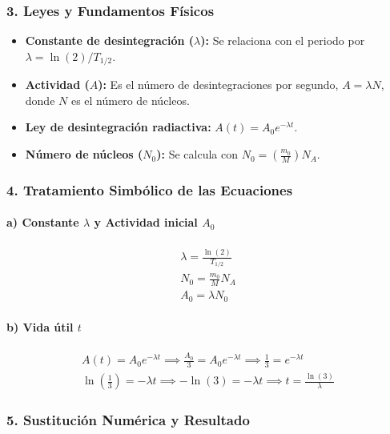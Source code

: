\subsubsection*{3. Leyes y Fundamentos Físicos}
\begin{itemize}
    \item \textbf{Constante de desintegración ($\lambda$):} Se relaciona con el periodo por $\lambda = \ln(2)/T_{1/2}$.
    \item \textbf{Actividad ($A$):} Es el número de desintegraciones por segundo, $A = \lambda N$, donde $N$ es el número de núcleos.
    \item \textbf{Ley de desintegración radiactiva:} $A(t) = A_0 e^{-\lambda t}$.
    \item \textbf{Número de núcleos ($N_0$):} Se calcula con $N_0 = (\frac{m_0}{M})N_A$.
\end{itemize}
\subsubsection*{4. Tratamiento Simbólico de las Ecuaciones}
\paragraph{a) Constante $\lambda$ y Actividad inicial $A_0$}
\begin{gather}
    \lambda = \frac{\ln(2)}{T_{1/2}} \\
    N_0 = \frac{m_0}{M}N_A \\
    A_0 = \lambda N_0
\end{gather}
\paragraph{b) Vida útil $t$}
\begin{gather}
    A(t) = A_0 e^{-\lambda t} \implies \frac{A_0}{3} = A_0 e^{-\lambda t} \implies \frac{1}{3} = e^{-\lambda t} \nonumber \\
    \ln\left(\frac{1}{3}\right) = -\lambda t \implies -\ln(3) = -\lambda t \implies t = \frac{\ln(3)}{\lambda}
\end{gather}
\subsubsection*{5. Sustitución Numérica y Resultado}
